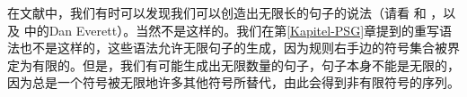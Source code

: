 
在文献中，我们有时可以发现我们可以创造出无限长的句子的说法（请看 和 ，以及 中的Dan Everett）。当然不是这样的。我们在第\ref{Kapitel-PSG}章提到的重写语法也不是这样的，这些语法允许无限句子的生成，因为规则右手边的符号集合被界定为有限的。但是，我们有可能生成出无限数量的句子，句子本身不能是无限的，因为总是一个符号被无限地许多其他符号所替代，由此会得到非有限符号的序列。


